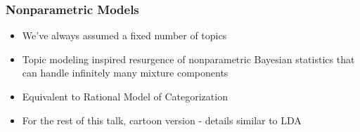 \begin{frame}
\begin{block}{
}
\begin{center}
\end{center}
\end{block}

\end{frame}

\ifnonpar

\begin{frame}
\frametitle{Nonparametric Models}

\begin{itemize}
\item We've always assumed a fixed number of topics
\item Topic modeling inspired resurgence of nonparametric Bayesian statistics that can handle infinitely many mixture components~\cite{antoniak-74}
\item Equivalent to Rational Model of Categorization~\cite{griffiths-07b}
\item For the rest of this talk, cartoon version - details similar to LDA
\end{itemize}

\end{frame}



